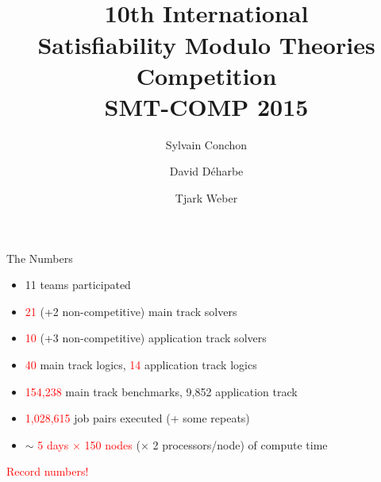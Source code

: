 \documentclass{beamer}
\title{${}$\\[3em]10th International\\
Satisfiability Modulo Theories\\
Competition\\[.7em]
SMT-COMP 2015\\[3em]}
\author{Sylvain Conchon \and David D{\'e}harbe \and Tjark Weber}
\institute{}
\date{}
\newcommand{\record}[1]{\textcolor{red}{#1}}
\begin{document}

\frame{\titlepage}
\logo{}


\section{}%
\subsection{}%


\begin{frame}{The Numbers}
\begin{itemize}
\item 11 teams participated
  \smallskip
\item \record{21} (+2 non-competitive) main track solvers
\item \record{10} (+3 non-competitive) application track solvers
  \smallskip
\item \record{40} main track logics, \record{14} application track
  logics
\item \record{154,238} main track benchmarks, 9,852 application track
  \smallskip
\item \record{1,028,615} job pairs executed (+ some repeats)
\item $\sim$ \record{5 days $\times$ 150 nodes} ($\times$ 2
  processors/node) of compute time
\end{itemize}

\bigskip

\record{Record numbers!}
\end{frame}

\end{document}
